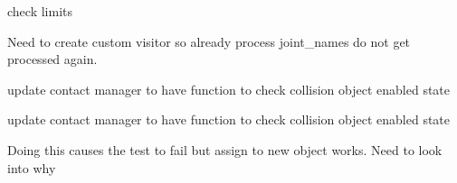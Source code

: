 \begin{DoxyRefList}
%
check limits  
\item[Member \mbox{\hyperlink{classtesseract__scene__graph_1_1SceneGraph_a3d78ee8fc4abe4542a4d4f5195a972c5}{tesseract\+\_\+scene\+\_\+graph\+::Scene\+Graph\+::get\+Joint\+Children\+Names}} (const std\+::vector$<$ std\+::string $>$ \&names) const]\label{todo__todo000007}%
%
Need to create custom visitor so already process joint\+\_\+names do not get processed again.  
\item[Member \mbox{\hyperlink{tesseract__environment__unit_8cpp_a0885de2a8da955b4bb9b9be73de49350}{TEST}} (Tesseract\+Environment\+Unit, Env\+Change\+Link\+Collision\+Enabled\+Command\+Unit)]\label{todo__todo000005}%
%
update contact manager to have function to check collision object enabled state  
\item[Member \mbox{\hyperlink{tesseract__environment__unit_8cpp_aa8be7c5729a18846a93f15be668f8d93}{TEST}} (Tesseract\+Environment\+Unit, Env\+Change\+Link\+Visibility\+Command\+Unit)]\label{todo__todo000006}%
%
update contact manager to have function to check collision object enabled state  
\item[Member \mbox{\hyperlink{tesseract__scene__graph__unit_8cpp_a07e5d7fb0413d0780df4b637bcd35845}{TEST}} (Tesseract\+Scene\+Graph\+Unit, Tesseract\+Scene\+Graph\+Remove\+Link\+Unit)]\label{todo__todo000008}%
%
Doing this causes the test to fail but assign to new object works. Need to look into why 
\end{DoxyRefList}